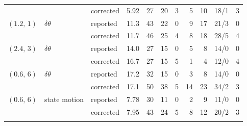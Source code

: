 \documentclass[10pt]{article}
\begin{document}
\begin{table}[H]
\begin{tabular}{lllrrrrrrcr}
 &  & corrected & 5.92 & 27 & 20 & 3 & 5 & 10 & 18/1 & 3 \\
\addlinespace[2pt]
$(1.2,\,1)$ & $\delta\theta$ & reported & 11.3 & 43 & 22 & 0 & 9 & 17 & 21/3 & 0 \\
 &  & corrected & 11.7 & 46 & 25 & 4 & 8 & 18 & 28/5 & 4 \\
\addlinespace[2pt]
$(2.4,\,3)$ & $\delta\theta$ & reported & 14.0 & 27 & 15 & 0 & 5 & 8 & 14/0 & 0 \\
 &  & corrected & 16.7 & 27 & 15 & 5 & 1 & 4 & 12/0 & 4 \\
\addlinespace[2pt]
$(0.6,\,6)$ & $\delta\theta$ & reported & 17.2 & 32 & 15 & 0 & 3 & 8 & 14/0 & 0 \\
 &  & corrected & 17.1 & 50 & 38 & 5 & 14 & 23 & 34/2 & 3 \\
\addlinespace[2pt]
$(0.6,\,6)$ & state motion & reported & 7.78 & 30 & 11 & 0 & 2 & 9 & 11/0 & 0 \\
 &  & corrected & 7.95 & 43 & 24 & 5 & 8 & 12 & 20/2 & 3 \\
\addlinespace[2pt]
\bottomrule\end{tabular}\end{table}
\clearpage
\end{document}

